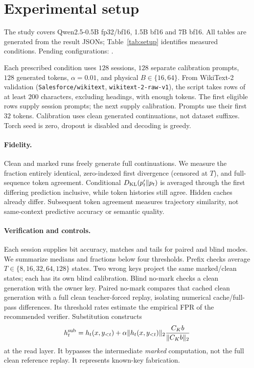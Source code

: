 \documentclass[11pt]{article}
\begin{document}
\section{Experimental setup}
The study covers Qwen2.5-0.5B fp32/bf16, 1.5B bf16 and 7B bf16. All tables are
generated from the result JSONs; Table~\ref{tab:setup} identifies measured
conditions. Pending configurations: \MissingRuns.

Each prescribed condition uses $128$ sessions, $128$ separate calibration prompts,
$128$ generated tokens, $\alpha=0.01$, and physical $B\in\{16,64\}$.
From WikiText-2 validation (\texttt{Salesforce/wikitext},
\texttt{wikitext-2-raw-v1}), the script takes rows of at least $200$ characters,
excluding headings, with enough tokens. The first eligible rows supply session
prompts; the next supply calibration. Prompts use their first $32$ tokens.
Calibration uses clean generated continuations, not dataset suffixes. Torch seed
is zero, dropout is disabled and decoding is greedy.

\paragraph{Fidelity.}
Clean and marked runs freely generate full continuations. We measure the fraction
entirely identical, zero-indexed first divergence (censored at $T$), and full-sequence
token agreement. Conditional $D_{\rm KL}(p'_t\|p_t)$ is averaged through the first
differing prediction inclusive, while token histories still agree. Hidden caches
already differ. Subsequent token agreement measures trajectory similarity, not
same-context predictive accuracy or semantic quality.

\paragraph{Verification and controls.}
Each session supplies bit accuracy, matches and tails for paired and blind modes.
We summarize medians and fractions below four thresholds. Prefix checks average
$T\in\{8,16,32,64,128\}$ states. Two wrong keys project the same marked/clean states;
each has its own blind calibration. Blind no-mark checks a clean generation with
the owner key. Paired no-mark compares that cached clean generation with a full
clean teacher-forced replay, isolating numerical cache/full-pass differences.
Its threshold rates estimate the empirical FPR of the recommended verifier.
Substitution constructs
\begin{equation}
 h_t^{\rm sub}=h_t(x,y_{<t})+
       \alpha\|h_t(x,y_{<t})\|_2\frac{C_Kb}{\|C_Kb\|_2}
\end{equation}
at the read layer. It bypasses the intermediate \emph{marked} computation, not
the full clean reference replay. It represents known-key fabrication.
\end{document}
